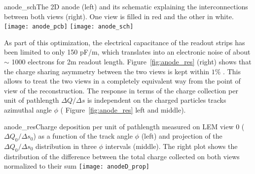 \begin{cdrfigure}{anode_sch}{The 2D anode (left) and its schematic explaining the  interconnections between both views (right). One view is filled  in red and the other in white.}
\texttt{[image: anode\_pcb]} \hspace{0.2cm} \texttt{[image: anode\_sch]}
\end{cdrfigure}

As part of this optimization, the electrical capacitance of  the readout strips  has been limited to only 150 pF/m, which translates into an electronic noise of about $\sim$ 1000 electrons for 2m readout length.  Figure~\ref{fig:anode_res} (right) shows that the charge sharing asymmetry between the two views is kept within $1\%$ . This allows to treat the two views in a completely equivalent way from the point of view of the reconstruction. The response in terms of the charge collection per unit of pathlength  $\Delta Q/\Delta s$ is independent on the charged particles tracks azimuthal angle $\phi$ ( Figure~\ref{fig:anode_res} left and middle).

\begin{cdrfigure}{anode_res}{Charge deposition per unit of pathlength measured on LEM view 0 ( $\Delta Q_0/\Delta s_0$) as a function  of the track angle $\phi$ (left) and projection of the  $\Delta Q_0/\Delta s_0$ distribution in three $\phi$ intervals (middle). The right plot  shows the distribution of the difference between the total charge  collected on both views normalized to their sum}
\texttt{[image: anodeD\_prop]}
\end{cdrfigure}

